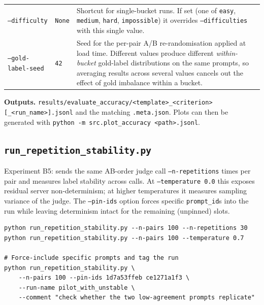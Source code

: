 \begin{longtable}{@{}llp{7.5cm}@{}}
  \texttt{--difficulty}    & \texttt{None}          & Shortcut for single-bucket runs. If set (one of \texttt{easy}, \texttt{medium}, \texttt{hard}, \texttt{impossible}) it overrides \texttt{--difficulties} with this single value. \\
  \texttt{--gold-label-seed} & \texttt{42}          & Seed for the per-pair A/B re-randomisation applied at load time. Different values produce different \emph{within-bucket} gold-label distributions on the same prompts, so averaging results across several values cancels out the effect of gold imbalance within a bucket. \\
  \bottomrule
\end{longtable}

\textbf{Outputs.} \texttt{results/evaluate\_accuracy/<template>\_<criterion>[\_<run\_name>].jsonl}
and the matching \texttt{.meta.json}. Plots can then be generated with
\texttt{python -m src.plot\_accuracy <path>.jsonl}.


\subsection{\texttt{run\_repetition\_stability.py}}\label{sec:cli-rep}

Experiment B5: sends the same AB-order judge call \texttt{--n-repetitions}
times per pair and measures label stability across calls. At
\texttt{--temperature~0.0} this exposes residual server non-determinism; at
higher temperatures it measures sampling variance of the judge. The
\texttt{--pin-ids} option forces specific \texttt{prompt\_id}s into the run
while leaving determinism intact for the remaining (unpinned) slots.

\begin{lstlisting}[title={\small Typical invocation}]
python run_repetition_stability.py --n-pairs 100 --n-repetitions 30
python run_repetition_stability.py --n-pairs 100 --temperature 0.7

# Force-include specific prompts and tag the run
python run_repetition_stability.py \
    --n-pairs 100 --pin-ids 1d7a53ffeb ce1271a1f3 \
    --run-name pilot_with_unstable \
    --comment "check whether the two low-agreement prompts replicate"
\end{lstlisting}

